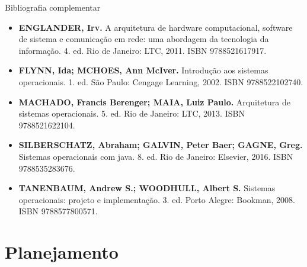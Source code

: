 \documentclass{beamer}
\begin{document}
\begin{frame}{Bibliografia complementar}
      \begin{itemize}
            \item \textbf{ENGLANDER, Irv.} A arquitetura de hardware computacional, software de sistema e comunicação em rede: uma abordagem da tecnologia da informação. 4. ed. Rio de Janeiro: LTC, 2011. ISBN 9788521617917.

            \item \textbf{FLYNN, Ida; MCHOES, Ann McIver.} Introdução aos sistemas operacionais. 1. ed. São Paulo: Cengage Learning, 2002. ISBN 9788522102740.
        
            \item \textbf{MACHADO, Francis Berenger; MAIA, Luiz Paulo.} Arquitetura de sistemas operacionais. 5. ed. Rio de Janeiro: LTC, 2013. ISBN 9788521622104.
        
            \item \textbf{SILBERSCHATZ, Abraham; GALVIN, Peter Baer; GAGNE, Greg.} Sistemas operacionais com java. 8. ed. Rio de Janeiro: Elsevier, 2016. ISBN 9788535283676.
        
            \item \textbf{TANENBAUM, Andrew S.; WOODHULL, Albert S.} Sistemas operacionais: projeto e implementação. 3. ed. Porto Alegre: Bookman, 2008. ISBN 9788577800571.
      \end{itemize}
\end{frame}



\section{Planejamento}
\end{document}
